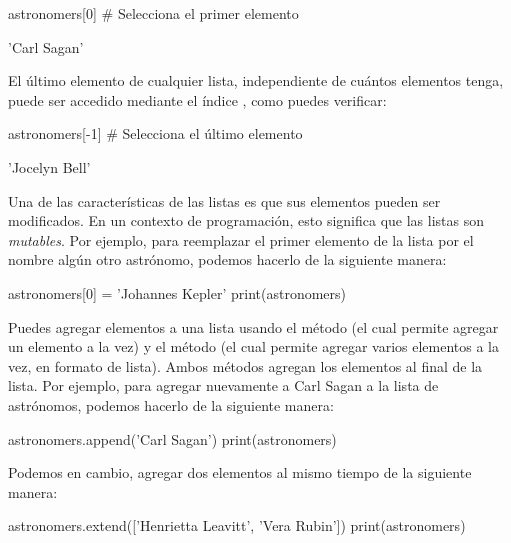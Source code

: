 \begin{pyin}
astronomers[0] # Selecciona el primer elemento
\end{pyin}
\begin{pyout}
'Carl Sagan'
\end{pyout}

El último elemento de cualquier lista, independiente de cuántos elementos tenga, puede ser accedido mediante el índice , como puedes verificar:

\begin{pyin}
astronomers[-1] # Selecciona el último elemento
\end{pyin}
\begin{pyout}
'Jocelyn Bell'
\end{pyout}

Una de las características de las listas es que sus elementos pueden ser modificados. En un contexto de programación, esto significa que las listas son \emph{mutables}. Por ejemplo, para reemplazar el primer elemento de la lista por el nombre algún otro astrónomo, podemos hacerlo de la siguiente manera:

\begin{pyin}
astronomers[0] = 'Johannes Kepler'
print(astronomers)
\end{pyin}
\begin{pyprint}
\end{pyprint}

Puedes agregar elementos a una lista usando el método  (el cual permite agregar un elemento a la vez) y el método  (el cual permite agregar varios elementos a la vez, en formato de lista). Ambos métodos agregan los elementos al final de la lista. Por ejemplo, para agregar nuevamente a Carl Sagan a la lista de astrónomos, podemos hacerlo de la siguiente manera: 

\begin{pyin}
astronomers.append('Carl Sagan')
print(astronomers)
\end{pyin}
\begin{pyprint}
\end{pyprint}

Podemos en cambio, agregar dos elementos al mismo tiempo de la siguiente manera:

\begin{pyin}
astronomers.extend(['Henrietta Leavitt', 'Vera Rubin'])
print(astronomers)
\end{pyin}
\begin{pyprint}
\end{pyprint}

